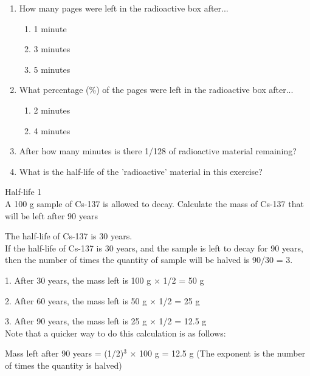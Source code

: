 {\begin{enumerate}
\item{How many pages were left in the radioactive box after...
\begin{enumerate}
\item{1 minute}
\item{3 minutes}
\item{5 minutes}
\end{enumerate}
}
\item{What percentage (\%) of the pages were left in the radioactive box after...
\begin{enumerate}
\item{2 minutes}
\item{4 minutes}
\end{enumerate}
}
\item{After how many minutes is there 1/128 of radioactive material remaining?}
\item{What is the half-life of the 'radioactive' material in this exercise?}
\end{enumerate}
}


\begin{wex}{Half-life 1\\}{A 100 g sample of Cs-137 is allowed to decay. Calculate the mass of Cs-137 that will be left after 90 years\\}

{
The half-life of Cs-137 is 30 years.\\
}
{
If the half-life of Cs-137 is 30 years, and the sample is left to decay for 90 years, then the number of times the quantity of sample will be halved is 90/30 = 3.\\
}
{
1. After 30 years, the mass left is 100 g $\times$ 1/2 = 50 g

2. After 60 years, the mass left is 50 g $\times$ 1/2 = 25 g

3. After 90 years, the mass left is 25 g $\times$ 1/2 = 12.5 g\\

Note that a quicker way to do this calculation is as follows:

Mass left after 90 years = (1/2)$^{3}$ $\times$ 100 g = 12.5 g (The exponent is the number of times the quantity is halved)

}
\end{wex}

